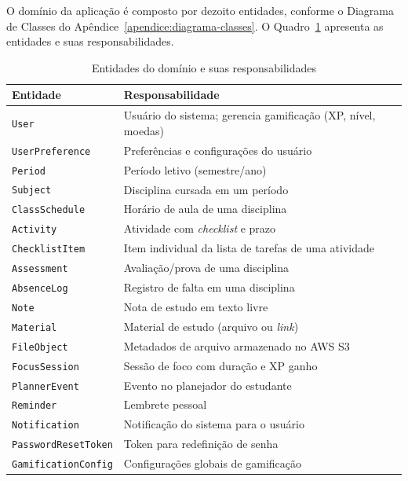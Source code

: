 O domínio da aplicação é composto por dezoito entidades, conforme o Diagrama de
Classes do Apêndice~\ref{apendice:diagrama-classes}. O Quadro~\ref{qdr:entidades}
apresenta as entidades e suas responsabilidades.

\begin{table}[H]
  \centering
  \caption{Entidades do domínio e suas responsabilidades}
  \label{qdr:entidades}
  \begin{tabular}{ll}
    \toprule
    \textbf{Entidade}       & \textbf{Responsabilidade}                                   \\
    \midrule
    \texttt{User}           & Usuário do sistema; gerencia gamificação (XP, nível, moedas) \\
    \texttt{UserPreference} & Preferências e configurações do usuário                      \\
    \texttt{Period}         & Período letivo (semestre/ano)                                \\
    \texttt{Subject}        & Disciplina cursada em um período                             \\
    \texttt{ClassSchedule}  & Horário de aula de uma disciplina                            \\
    \texttt{Activity}       & Atividade com \textit{checklist} e prazo                     \\
    \texttt{ChecklistItem}  & Item individual da lista de tarefas de uma atividade         \\
    \texttt{Assessment}     & Avaliação/prova de uma disciplina                            \\
    \texttt{AbsenceLog}     & Registro de falta em uma disciplina                          \\
    \texttt{Note}           & Nota de estudo em texto livre                                \\
    \texttt{Material}       & Material de estudo (arquivo ou \textit{link})                \\
    \texttt{FileObject}     & Metadados de arquivo armazenado no AWS S3                    \\
    \texttt{FocusSession}   & Sessão de foco com duração e XP ganho                        \\
    \texttt{PlannerEvent}   & Evento no planejador do estudante                            \\
    \texttt{Reminder}       & Lembrete pessoal                                             \\
    \texttt{Notification}   & Notificação do sistema para o usuário                        \\
    \texttt{PasswordResetToken} & Token para redefinição de senha                         \\
    \texttt{GamificationConfig} & Configurações globais de gamificação                   \\
    \bottomrule
  \end{tabular}
\end{table}


